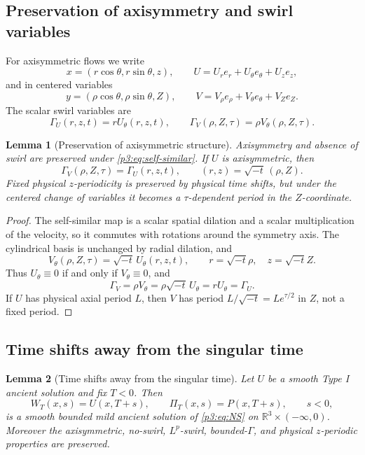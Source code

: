 \documentclass[11pt]{amsart}
\theoremstyle{plain}
\newtheorem{lemma}[lemma]{Lemma}
\theoremstyle{definition}
\theoremstyle{remark}
\numberwithin{equation}{section}
\begin{document}
\subsection{Preservation of axisymmetry and swirl variables}

For axisymmetric flows we write
\[
   x=(r\cos\theta,r\sin\theta,z),\qquad
   U=U_re_r+U_\theta e_\theta+U_ze_z,
\]
and in centered variables
\[
   y=(\rho\cos\theta,\rho\sin\theta,Z),\qquad
   V=V_\rho e_\rho+V_\theta e_\theta+V_Ze_Z.
\]
The scalar swirl variables are
\[
   \Gamma_U(r,z,t)=rU_\theta(r,z,t),\qquad
   \Gamma_V(\rho,Z,\tau)=\rho V_\theta(\rho,Z,\tau).
\]

\begin{lemma}[Preservation of axisymmetric structure]
\label{p3:lem:structure-preserved}
Axisymmetry and absence of swirl are preserved under
\eqref{p3:eq:self-similar}.  If \(U\) is axisymmetric, then
\[
   \Gamma_V(\rho,Z,\tau)=\Gamma_U(r,z,t),
   \qquad
   (r,z)=\sqrt{-t}\,(\rho,Z).
\]
Fixed physical \(z\)-periodicity is preserved by physical time shifts, but
under the centered change of variables it becomes a \(\tau\)-dependent period
in the \(Z\)-coordinate.
\end{lemma}

\begin{proof}
The self-similar map is a scalar spatial dilation and a scalar multiplication
of the velocity, so it commutes with rotations around the symmetry axis.
The cylindrical basis is unchanged by radial dilation, and
\[
   V_\theta(\rho,Z,\tau)
   =
   \sqrt{-t}\,U_\theta(r,z,t),
   \qquad
   r=\sqrt{-t}\rho,\quad z=\sqrt{-t}Z .
\]
Thus \(U_\theta\equiv0\) if and only if \(V_\theta\equiv0\), and
\[
   \Gamma_V=\rho V_\theta
   =
   \rho\sqrt{-t}\,U_\theta
   =
   rU_\theta
   =
   \Gamma_U .
\]
If \(U\) has physical axial period \(L\), then \(V\) has period
\(L/\sqrt{-t}=Le^{\tau/2}\) in \(Z\), not a fixed period.
\end{proof}

\subsection{Time shifts away from the singular time}

\begin{lemma}[Time shifts away from the singular time]
\label{p3:lem:time-shift}
Let \(U\) be a smooth Type I ancient solution and fix \(T<0\).  Then
\[
   W_T(x,s)=U(x,T+s),\qquad \Pi_T(x,s)=P(x,T+s),\qquad s<0,
\]
is a smooth bounded mild ancient solution of \eqref{p3:eq:NS} on
\(\mathbb R^3\times(-\infty,0)\).  Moreover the axisymmetric, no-swirl,
\(L^p\)-swirl, bounded-\(\Gamma\), and physical \(z\)-periodic properties are
preserved.
\end{lemma}
\end{document}
